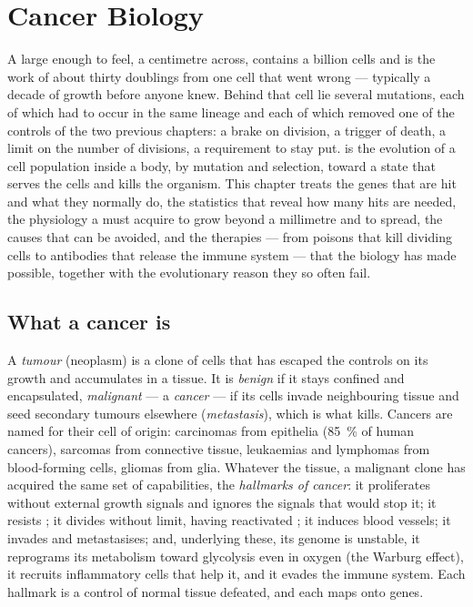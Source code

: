\chapter{Cancer Biology}\label{ch:b3:cancer-biology}

A  large enough to feel, a centimetre across, contains a billion
cells and is the work of about thirty doublings from one cell that went
wrong --- typically a decade of growth before anyone knew. Behind that
cell lie several mutations, each of which had to occur in the same
lineage and each of which removed one of the controls of the two
previous chapters: a brake on division, a trigger of death, a limit on
the number of divisions, a requirement to stay put.  is the
evolution of a cell population inside a body, by mutation and selection,
toward a state that serves the cells and kills the organism. This
chapter treats the genes that are hit and what they normally do, the
statistics that reveal how many hits are needed, the physiology a
 must acquire to grow beyond a millimetre and to spread, the
causes that can be avoided, and the therapies --- from poisons that
kill dividing cells to antibodies that release the immune system ---
that the biology has made possible, together with the evolutionary
reason they so often fail.

\section{What a cancer is}

\begin{definition}\label{def:b3:cancer-biology:hallmarks}
A \emph{tumour} (neoplasm) is a clone of cells that has escaped the
controls on its growth and accumulates in a tissue. It is \emph{benign}
if it stays confined and encapsulated, \emph{malignant} --- a
\emph{cancer} --- if its cells invade neighbouring tissue and seed
secondary tumours elsewhere (\emph{metastasis}), which is what kills.
Cancers are named for their cell of origin: carcinomas from epithelia
(\qty{85}{\%} of human cancers), sarcomas from connective tissue,
leukaemias and lymphomas from blood-forming cells, gliomas from glia.
Whatever the tissue, a malignant clone has acquired the same set of
capabilities, the \emph{hallmarks of cancer}: it proliferates without
external growth signals and ignores the signals that would stop it; it
resists ; it divides without limit, having reactivated
; it induces blood vessels; it invades and metastasises;
and, underlying these, its genome is unstable, it reprograms its
metabolism toward glycolysis even in oxygen (the Warburg effect), it
recruits inflammatory cells that help it, and it evades the immune
system. Each hallmark is a control of normal tissue defeated, and each
maps onto genes.
\end{definition}

